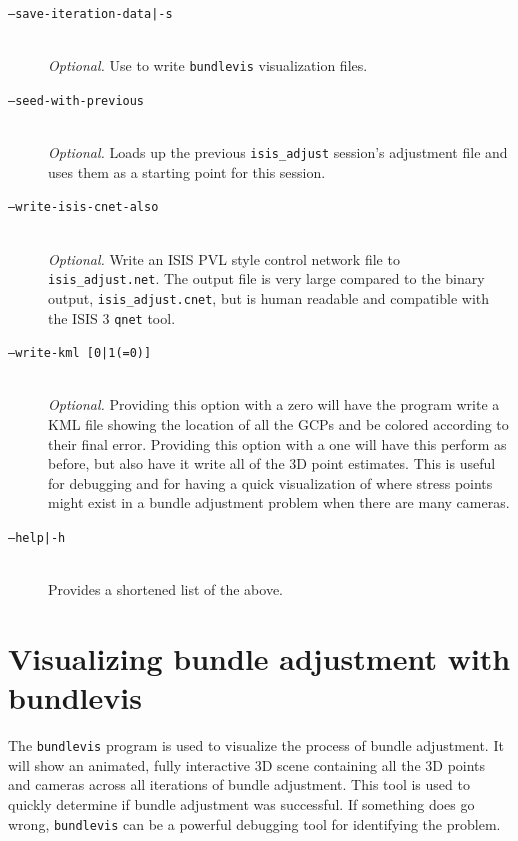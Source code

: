 \begin{description}
\item[\texttt{--save-iteration-data|-s}] \hfill \\
  \emph{Optional.} Use to write {\tt bundlevis} visualization files.

\item[\texttt{--seed-with-previous}] \hfill \\
  \emph{Optional.} Loads up the previous {\tt isis\_adjust} session's
  adjustment file and uses them as a starting point for this session.

\item[\texttt{--write-isis-cnet-also}] \hfill \\
  \emph{Optional.} Write an \ac{ISIS} \ac{PVL} style control network file to
  \texttt{isis\_adjust.net}. The output file is very large compared to
  the binary output, \texttt{isis\_adjust.cnet}, but is human readable
  and compatible with the \ac{ISIS} 3 \texttt{qnet} tool.

\item[\texttt{--write-kml [0|1(=0)]}] \hfill \\
  \emph{Optional.} Providing this option with a zero will have the
  program write a \ac{KML} file showing the location of all the \acp{GCP}
  and be colored according to their final error. Providing this
  option with a one will have this perform as before, but also have it
  write all of the 3D point estimates. This is useful for debugging and
  for having a quick visualization of where stress points might exist in
  a bundle adjustment problem when there are many cameras.

\item[\texttt{--help|-h}] \hfill \\
  Provides a shortened list of the above.

\end{description}

\section{Visualizing bundle adjustment with bundlevis}

The \texttt{bundlevis} program is used to visualize the process of
bundle adjustment. It will show an animated, fully interactive 3D
scene containing all the 3D points and cameras across all iterations
of bundle adjustment.  This tool is used to quickly determine if
bundle adjustment was successful.  If something does go wrong,
\texttt{bundlevis} can be a powerful debugging tool for identifying
the problem.


